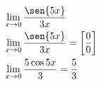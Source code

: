 \begin{ex}
\begin{align}
&\lim_{x\rightarrow 0} \frac{\sen{5x}}{3x}\nonumber\\
&\lim_{x\rightarrow 0} \frac{\sen{5x}}{3x}=\left[\frac{0}{0}\right]\nonumber\\
&\lim_{x\rightarrow 0} \frac{5\cos{5x}}{3}=\frac{5}{3}\nonumber
\end{align}
\end{ex}